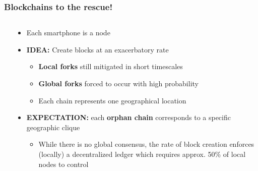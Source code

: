 \documentclass{beamer}
\begin{document}
\begin{frame}
	\frametitle{Blockchains to the rescue!}
	\begin{columns}
		\begin{column}{0.3\textwidth}
			\hfil
		\end{column}

		\begin{column}{0.7\textwidth}
			\begin{itemize}
				\item Each smartphone is a node
				\item \textbf{IDEA:} Create blocks at an exacerbatory rate
				\begin{itemize}
					\item \textbf{Local forks} still mitigated in short timescales
					\item \textbf{Global forks} forced to occur with high probability
					\item Each chain represents one geographical location
				\end{itemize}
				\item \textbf{EXPECTATION:} each \textbf{orphan chain} corresponds to a specific geographic clique
				\begin{itemize}
					\item While there is no global consensus, the rate of block creation enforces (locally) a decentralized ledger which requires approx. 50\% of local nodes to control
				\end{itemize}
			\end{itemize}
		\end{column}
	\end{columns}
\end{frame}
\end{document}
